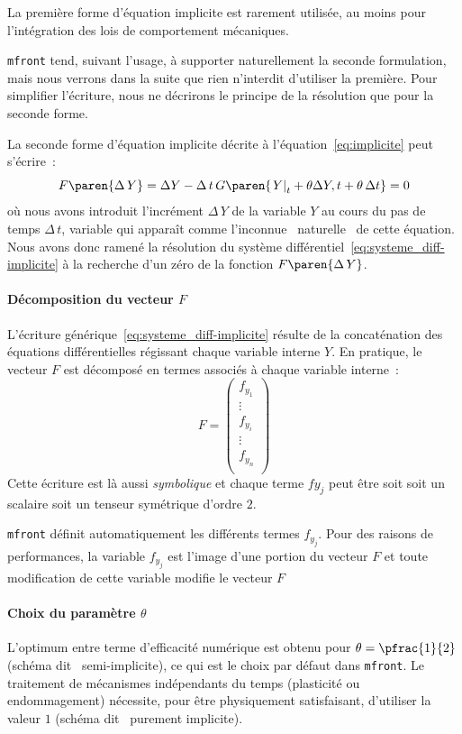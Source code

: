 \documentclass[rectoverso,pleiades,pstricks,leqno,anti]{texmf/note_technique_2010}
\newcommand{\mfront}{\texttt{mfront}}
\newcommand{\debutpas}[1]{\ensuremath{\left.#1\right|_{t}}}
\begin{document}
La première forme d'équation implicite est rarement utilisée, au moins
pour l'intégration des lois de comportement mécaniques.

\mfront{} tend, suivant l'usage, à supporter naturellement la seconde
formulation, mais nous verrons dans la suite que rien n'interdit
d'utiliser la première. Pour simplifier l'écriture, nous ne décrirons
le principe de la résolution que pour la seconde forme.

La seconde forme d'équation implicite décrite à
l'équation~\eqref{eq:implicite} peut s'écrire~:
\begin{equation}
  \label{eq:F_implicite} F\paren{\Delta\, Y} = \Delta Y -
  \Delta\,t\,G\paren{\debutpas{Y}+\theta\Delta{Y},t+\theta\,\Delta t} =
  0
\end{equation}
où nous avons introduit l'incrément \(\Delta\,Y\) de la variable \(Y\)
au cours du pas de temps \(\Delta\,t\), variable qui apparaît comme
l'inconnue \og~naturelle~\fg{} de cette équation. Nous avons donc ramené
la résolution du système différentiel~\eqref{eq:systeme_diff-implicite}
à la recherche d'un zéro de la fonction \(F\paren{\Delta\, Y}\).

\paragraph{Décomposition du vecteur $F$} L'écriture
générique~\ref{eq:systeme_diff-implicite} résulte de la concaténation
des équations différentielles régissant chaque variable interne \(Y\).
En pratique, le vecteur \(F\) est décomposé en termes associés à chaque
variable interne~:
\[
F=
\begin{pmatrix}
  f_{y_{1}} \\
  \vdots \\
  f_{y_{i}} \\
  \vdots \\
  f_{y_{n}} \\
\end{pmatrix}
\]
Cette écriture est là aussi {\em symbolique} et chaque terme
\(f{y_{j}}\) peut être soit soit un scalaire soit un tenseur symétrique
d'ordre \(2\).

\mfront{} définit automatiquement les différents termes \(f_{y_{j}}\).
Pour des raisons de performances, la variable \(f_{y_{j}}\) est l'image
d'une portion du vecteur \(F\) et toute modification de cette variable
modifie le vecteur \(F\)

\paragraph{Choix du paramètre $\theta$}
L'optimum entre terme d'efficacité numérique est obtenu pour
\(\theta=\pfrac{1}{2}\) (schéma dit \og~semi-implicite\fg{}), ce qui est
le choix par défaut dans \mfront{}. Le traitement de mécanismes
indépendants du temps (plasticité ou endommagement) nécessite, pour être
physiquement satisfaisant, d'utiliser la valeur \(1\) (schéma dit
\og~purement implicite\fg{}).
\end{document}
